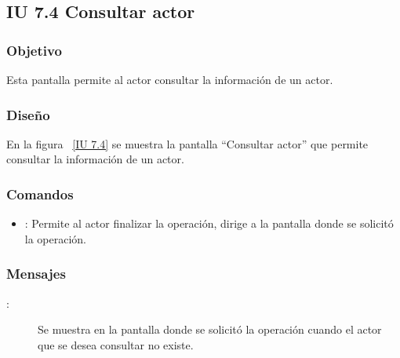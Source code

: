 \subsection{IU 7.4 Consultar actor}

\subsubsection{Objetivo}
	
	Esta pantalla permite al actor consultar la información de un actor.

\subsubsection{Diseño}

    En la figura ~\ref{IU 7.4} se muestra la pantalla ``Consultar actor'' que permite consultar la información de un actor. \\



\subsubsection{Comandos}
\begin{itemize}
	\item {}: Permite al actor finalizar la operación, dirige a la pantalla donde se solicitó la operación.
\end{itemize}

\subsubsection{Mensajes}
	
\begin{description}
	\item[:] Se muestra en la pantalla donde se solicitó la operación cuando el actor que se desea consultar no existe.
\end{description}

